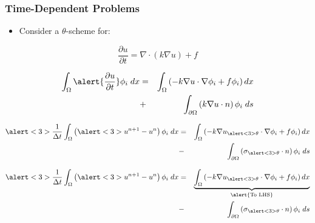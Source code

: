 \documentclass[
  compress
  ,12pt
]{beamer}
\newcommand{\bv}[1]{{\boldsymbol{#1}}}
\begin{document}
\begin{frame}[t]
  \frametitle{Time-Dependent Problems}
  \begin{itemize}
    \item{Consider a $\theta$-scheme for:}
  \end{itemize}

  \begin{equation}
    \nonumber
    \frac{\partial u}{\partial t} = \nabla \cdot \left(k \nabla u\right) + f
  \end{equation}

  {
  \begin{eqnarray}
    \nonumber
    \int_{\Omega} \alert{\frac{\partial u}{\partial t}} \phi_i \;dx &=&
    \int_{\Omega} \left(-k \nabla u \cdot \nabla \phi_i +f\phi_i\right) dx
    \\
    \nonumber
    &+&
    \int_{\partial \Omega} \left( k\nabla u \cdot n\right)\phi_i \;ds
  \end{eqnarray}
  }

  {
  \begin{eqnarray}
    \nonumber
    \alert<3>{\frac{1}{\Delta t}}\int_{\Omega} \left(\alert<3>{u^{n+1} - u^n}\right) \phi_i \;dx &=&
    \int_{\Omega} \left(-k \nabla u_{\alert<3>{\theta}} \cdot \nabla \phi_i +f\phi_i\right)dx
    \\
    \nonumber
    &-&
      \int_{\partial \Omega} \left( \sigma_{\alert<3>{\theta}} \cdot n\right)\phi_i \;ds
  \end{eqnarray}
  }
  
  {
  \begin{eqnarray}
    \nonumber
    \alert<3>{\frac{1}{\Delta t}}\int_{\Omega} \left(\alert<3>{u^{n+1} - u^n}\right) \phi_i \;dx &=&
    \underbrace{ 
    \int_{\Omega} \left(-k \nabla u_{\alert<3>{\theta}} \cdot \nabla \phi_i +f\phi_i\right)dx
    }_{\alert{\text{To LHS}}}
    \\
    \nonumber
    &-&
      \int_{\partial \Omega} \left( \sigma_{\alert<3>{\theta}} \cdot n\right)\phi_i \;ds
  \end{eqnarray}
  }


\end{frame}
\end{document}

